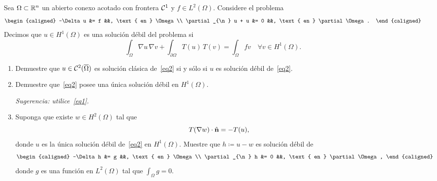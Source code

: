 \begin{Problema}
	Sea \(\Omega\subset\mathbb{R}^n\) un abierto conexo acotado con frontera
	\(\mathcal{C}^1\) y \(f\in L^{2}(\Omega)\). Considere el problema
	\begin{equation}\label{eq2}
	\begin{caligned}
		-\Delta u &= f &&, \text{ en } \Omega\\
		\partial_{\n} u + u &= 0 &&, \text{ en } \partial\Omega.
	\end{caligned}
	\end{equation}
	Decimos que \(u\in H^{1}(\Omega)\) es una solución débil del
	problema si 
	\begin{displaymath}
		\int_{\Omega} \nabla u \, \nabla v
		+
		\int_{\partial\Omega} T(u)\, T(v)
		=
		\int_{\Omega} fv
		\quad\forall v\in H^{1}(\Omega).
	\end{displaymath}
	\begin{enumerate}[label=(\alph*)]
		\item
		Demuestre que \(u\in \mathcal{C}^{2}(\overline\Omega)\) es solución
		clásica de~\eqref{eq2} si y sólo si \(u\) es solución débil
		de~\eqref{eq2}.

		\item 
		Demuestre que~\eqref{eq2} posee una única solución débil en
		\(H^{1}(\Omega)\).

		\textit{Sugerencia: utilice~\eqref{eq1}.}

		\item
		Suponga que existe \(w\in H^{2}(\Omega)\) tal que 
		\begin{displaymath}
			T(\nabla w) \cdot \hat{\textbf{n}}
			=
			-T(u),
		\end{displaymath}
		donde \(u\) es la única solución débil de~\eqref{eq2} en
		\(H^{1}(\Omega)\). Muestre que \(h \coloneqq u - w\) es
		solución débil de
		\begin{displaymath}
		\begin{caligned}
			-\Delta h &= g &&, \text{ en } \Omega\\
			\partial_{\n} h &= 0 &&, \text{ en } \partial\Omega,
		\end{caligned}
		\end{displaymath}
		donde \(g\) es una función en \(L^{2}(\Omega)\) tal que
		\(\int_{\Omega} g = 0\).
	\end{enumerate}
\end{Problema}
